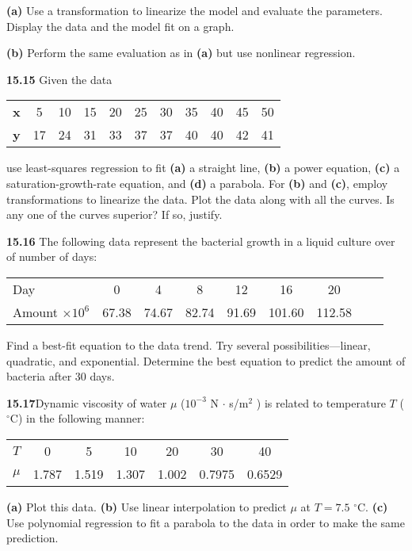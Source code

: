 \documentclass[../main.tex]{subfiles}
\begin{document}
\begin{multicols}{2}
	\noindent \textbf{(a)} Use a transformation to linearize the model and evaluate
the parameters. Display the data and the model fit on a
graph.

\noindent \textbf{(b)} Perform the same evaluation as in \textbf{(a)} but use nonlinear
regression.
 
	\noindent\textbf{15.15} Given the data

	\begin{tabular}{l c c c c c c c c c c }
		\textbf{x} & 5 & 10 & 15 & 20 & 25 & 30 & 35 & 40 & 45 & 50 \\
		\textbf{y} & 17 & 24 & 31 & 33 & 37 & 37 & 40 & 40 & 42 & 41
	\end{tabular}

	\noindent use least-squares regression to fit \textbf{(a)} a straight line, \textbf{(b)} a
	power equation, \textbf{(c)} a saturation-growth-rate equation, and
	\textbf{(d)} a parabola. For \textbf{(b)} and \textbf{(c)}, employ transformations to
	linearize the data. Plot the data along with all the curves. Is
	any one of the curves superior? If so, justify.

	\noindent\textbf{15.16} The following data represent the bacterial growth in a
	liquid culture over of number of days:

	\noindent
	\begin{tabular}{l c c c c c c c c}
		Day & 0 & 4 & 8 & 12 & 16 & 20 \\
		Amount $\times 10^6$ & 67.38 & 74.67 & 82.74 & 91.69 & 101.60 & 112.58
	\end{tabular}

	\noindent Find a best-fit equation to the data trend. Try several
	possibilities—linear, quadratic, and exponential. Determine
   the best equation to predict the amount of bacteria after
   30 days.

   \noindent\textbf{15.17}Dynamic viscosity of water $\mu$ ($10^{-3}$ N $\cdot $ s/m$^2$ ) is related to temperature $T$ ($^\circ$C) in the following manner:

	\noindent
	\begin{tabular}{l c c c c c c}
		$T$ &	0 &	5 &	10 &	20 &	30 &	40 \\
		$\mu$ & 1.787 & 1.519 & 1.307 &	1.002 &	0.7975 & 0.6529
	\end{tabular}
  
	\noindent \textbf{(a)} Plot this data.
	\noindent \textbf{(b)} Use linear interpolation to predict $\mu$ at $T = 7.5$ $^\circ$C.
	\noindent \textbf{(c)} Use polynomial regression to fit a parabola to the data in
order to make the same prediction.


\end{multicols}
\end{document}
